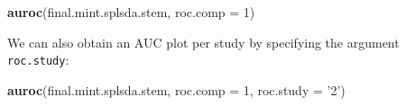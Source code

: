 \documentclass[]{book}
\newenvironment{Shaded}{\begin{snugshade}}{\end{snugshade}}
\newcommand{\KeywordTok}[1]{\textcolor[rgb]{0.13,0.29,0.53}{\textbf{#1}}}
\newcommand{\DataTypeTok}[1]{\textcolor[rgb]{0.13,0.29,0.53}{#1}}
\newcommand{\DecValTok}[1]{\textcolor[rgb]{0.00,0.00,0.81}{#1}}
\newcommand{\StringTok}[1]{\textcolor[rgb]{0.31,0.60,0.02}{#1}}
\newcommand{\NormalTok}[1]{#1}
\begin{document}
\begin{Shaded}
\begin{Highlighting}[]
\KeywordTok{auroc}\NormalTok{(final.mint.splsda.stem, }\DataTypeTok{roc.comp =} \DecValTok{1}\NormalTok{)}
\end{Highlighting}
\end{Shaded}

We can also obtain an AUC plot per study by specifying the argument
\texttt{roc.study}:

\begin{Shaded}
\begin{Highlighting}[]
\KeywordTok{auroc}\NormalTok{(final.mint.splsda.stem, }\DataTypeTok{roc.comp =} \DecValTok{1}\NormalTok{, }\DataTypeTok{roc.study =} \StringTok{'2'}\NormalTok{)}
\end{Highlighting}
\end{Shaded}
\end{document}
